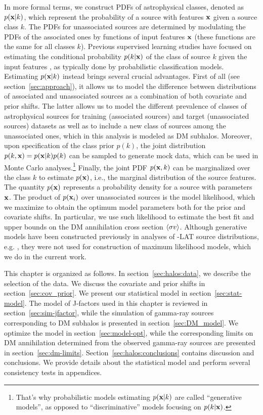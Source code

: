 In more formal terms, 
we construct PDFs of astrophysical classes, denoted as $p(\textbf{x}|k)$,
which represent the probability of a source with features $\textbf{x}$ given a source class $k$. 
The PDFs for unassociated sources are determined by modulating the PDFs of the associated ones by functions of input features $\textbf{x}$ (these functions are the same for all classes $k$).
Previous supervised learning studies have focused on estimating the conditional probability $p(k|\textbf{x})$ of the class of source $k$ given the input features 
\FermiMLclassif, as typically done by probabilistic classification models.
Estimating $p(\textbf{x}|k)$ instead brings several crucial advantages. First of all (see section~\ref{sec:approach}), it allows us to model the difference between distributions of associated and unassociated sources as a combination of both covariate and prior shifts.
The latter allows us to model the different prevalence of classes of astrophysical sources for training (associated sources) and target (unassociated sources) datasets as well as to include a new class of sources among the unassociated ones, which in this analysis is modeled as DM subhalos.
Moreover, upon specification of the class prior $p(k)$, the joint distribution $p(k,\textbf{x})=p(\textbf{x}|k)p(k)$ can be sampled to generate mock data, which can be used in Monte Carlo analyses.\footnote{That's why probabilistic models estimating $p(\textbf{x}|k)$ are called ``generative models'', as opposed to ``discriminative'' models focusing on $p(k|\textbf{x})$.} Finally, the joint PDF  $p(\textbf{x}, k)$ can be marginalized over the class $k$ to estimate $p(\textbf{x})$, i.e., the marginal distribution of the source features. 
The quantity $p(\textbf{x})$
represents a probability density for a source with parameters $\textbf{x}$. 
The product of $p(\textbf{x}_i)$ over unassociated sources is the model likelihood, which we maximize to obtain the optimum model parameters both for the prior and covariate shifts.
In particular, we use such likelihood to estimate the best fit and upper bounds on the DM annihilation cross section $\langle \sigma v \rangle$.
Although generative models have been constructed previously in analyses of \Fermi-LAT source distributions, e.g. \cite{2023MNRAS.520.1348G}, they were not used for construction of maximum likelihood models, which we do in the current work.

This chapter is organized as follows.
In section~\ref{sec:halos:data},
we describe the selection of the data.
We discuss the covariate and prior shifts in section~\ref{sec:cov_prior}. We present our statistical model in section~\ref{sec:stat-model}. 
The model of J-factors used in this chapter is reviewed in section~\ref{sec:sim-jfactor}, while the simulation of gamma-ray sources corresponding to DM subhalos is presented in section~\ref{sec:DM_model}.
We optimize the model in section~\ref{sec:model-opt}, while
the corresponding limits on DM annihilation determined from the observed gamma-ray sources are presented in section~\ref{sec:dm-limits}.
Section~\ref{sec:halos:conclusions} contains discussion and conclusions. 
We provide details about the statistical model and
perform several consistency tests in appendices.
